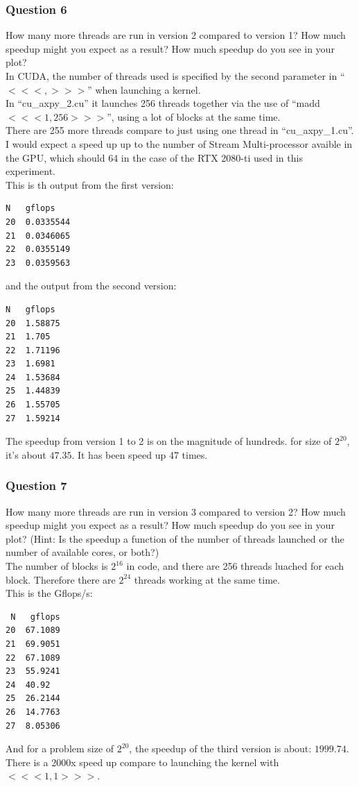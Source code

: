 \documentclass[]{article}
\begin{document}
        \subsubsection*{Question 6}
            How many more threads are run in version 2 compared to version 1? How much speedup might you expect as a result? How much speedup do you see in your plot?
            \\[1.1em]
            In CUDA, the number of threads used is specified by the second parameter in ``$<<<, >>>$'' when launching a kernel. 
            \\
            In ``cu\_axpy\_2.cu'' it launches 256 threads together via the use of ``madd$<<<1, 256>>>$'', using a lot of blocks at the same time. 
            \\
            There are 255 more threads compare to just using one thread in ``cu\_axpy\_1.cu''. 
            \\
            I would expect a speed up up to the number of Stream Multi-processor avaible in the GPU, which should 64 in the case of the RTX 2080-ti used in this experiment.
            \\
            This is th output from the first version: 
            \begin{lstlisting}
N	gflops
20	0.0335544
21	0.0346065
22	0.0355149
23	0.0359563
            \end{lstlisting}
            and the output from the second version: 
            \begin{lstlisting}
N	gflops
20	1.58875
21	1.705
22	1.71196
23	1.6981
24	1.53684
25	1.44839
26	1.55705
27	1.59214
            \end{lstlisting}
            The speedup from version 1 to 2 is on the magnitude of hundreds. for size of $2^{20}$, it's about $47.35$. It has been speed up 47 times. 
        \subsubsection*{Question 7}
            How many more threads are run in version 3 compared to version 2? How much speedup might you expect as a result? How much speedup do you see in your plot? (Hint: Is the speedup a function of the number of threads launched or the number of available cores, or both?)
            \\[1.1em]
            The number of blocks is $2^{16}$ in code, and there are 256 threads luached for each block. Therefore there are $2^{24}$ threads working at the same time. 
            \\
            This is the Gflops/s: 
            \\
            \begin{lstlisting} 
 N	 gflops
20	67.1089
21	69.9051
22	67.1089
23	55.9241
24	40.92
25	26.2144
26	14.7763
27	8.05306
            \end{lstlisting}
            And for a problem size of $2^{20}$, the speedup of the third version is about: $1999.74$. There is a 2000x speed up compare to launching the kernel with $<<<1, 1>>>$. 
\end{document}
